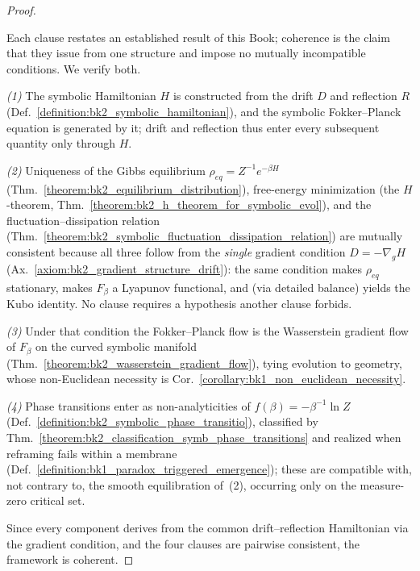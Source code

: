 \begin{proof}
\label{proof:bk2_coherence_of_symbolic_therm}
\leavevmode

Each clause restates an established result of this Book; coherence is the claim that they issue from one structure and impose no mutually incompatible conditions. We verify both.

\emph{(1)} The symbolic Hamiltonian $H$ is constructed from the drift $D$ and reflection $R$ (Def.~\ref{definition:bk2_symbolic_hamiltonian}), and the symbolic Fokker--Planck equation is generated by it; drift and reflection thus enter every subsequent quantity only through $H$.

\emph{(2)} Uniqueness of the Gibbs equilibrium $\rho_{eq}=Z^{-1}e^{-\beta H}$ (Thm.~\ref{theorem:bk2_equilibrium_distribution}), free-energy minimization (the $H$-theorem, Thm.~\ref{theorem:bk2_h_theorem_for_symbolic_evol}), and the fluctuation--dissipation relation (Thm.~\ref{theorem:bk2_symbolic_fluctuation_dissipation_relation}) are mutually consistent because all three follow from the \emph{single} gradient condition $D=-\nabla_g H$ (Ax.~\ref{axiom:bk2_gradient_structure_drift}): the same condition makes $\rho_{eq}$ stationary, makes $F_\beta$ a Lyapunov functional, and (via detailed balance) yields the Kubo identity. No clause requires a hypothesis another clause forbids.

\emph{(3)} Under that condition the Fokker--Planck flow is the Wasserstein gradient flow of $F_\beta$ on the curved symbolic manifold (Thm.~\ref{theorem:bk2_wasserstein_gradient_flow}), tying evolution to geometry, whose non-Euclidean necessity is Cor.~\ref{corollary:bk1_non_euclidean_necessity}.

\emph{(4)} Phase transitions enter as non-analyticities of $f(\beta)=-\beta^{-1}\ln Z$ (Def.~\ref{definition:bk2_symbolic_phase_transitio}), classified by Thm.~\ref{theorem:bk2_classification_symb_phase_transitions} and realized when reframing fails within a membrane (Def.~\ref{definition:bk1_paradox_triggered_emergence}); these are compatible with, not contrary to, the smooth equilibration of~(2), occurring only on the measure-zero critical set.

Since every component derives from the common drift--reflection Hamiltonian via the gradient condition, and the four clauses are pairwise consistent, the framework is coherent.
\end{proof}

